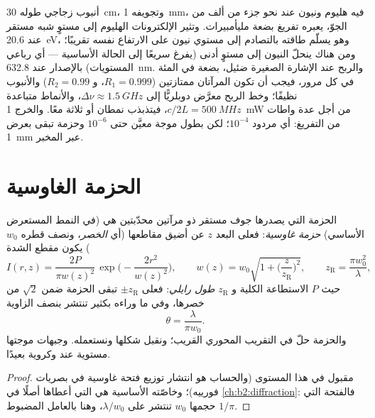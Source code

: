 \begin{example}\label{ex:b2:laser:hene}
أنبوب زجاجي طوله \qty{30}{cm}، وتجويفه \qty{1}{mm}، فيه هليوم
ونيون عند نحو جزء من ألف من الجوّ، يعبره تفريغ
بضعة مليأمبيرات. وتثير الإلكترونات الهليوم إلى مستوٍ شبه مستقر عند
\qty{20.6}{eV}، وهو يسلّم طاقته بالتصادم إلى مستوي نيون على
الارتفاع نفسه تقريبًا؛ ومن هناك ينحلّ النيون إلى مستوٍ أدنى
(يفرغ سريعًا إلى الحالة الأساسية --- أي رباعي المستويات) بالإصدار عند
\qty{632.8}{nm}. والربح عند الإشارة الصغيرة ضئيل، بضعة في المئة في كل
مرور، فيجب أن تكون المرآتان ممتازتين ($R_1 = 0.999$، و $R_2 = 0.99$)
والأنبوب نظيفًا؛ وخط الربح معرَّض دوبلريًّا إلى
$\Delta\nu \approx \qty{1.5}{GHz}$، والأنماط متباعدة $c/2L = \qty{500}{MHz}$،
فيتذبذب نمطان أو ثلاثة معًا. والخرج \qty{1}{mW} من أجل
عدة واطات من التفريغ: أي مردود $10^{-4}$؛ لكن بطول موجة
معيَّن حتى $10^{-6}$ وحزمة تبقى بعرض \qty{1}{mm} عبر
المخبر.
\end{example}

\section{الحزمة الغاوسية}

\begin{proposition}\label{prop:b2:laser:gaussian}
الحزمة التي يصدرها جوف مستقر ذو مرآتين محدّبتين هي (في
النمط المستعرض الأساسي) \emph{حزمة غاوسية}: فعلى البعد $z$ عن أضيق مقاطعها (أي
\emph{الخصر}، ونصف قطره $w_0$) يكون مقطع
الشدة
\[
I(r,z) = \frac{2P}{\pi w(z)^2}\,\exp\Big(-\frac{2r^2}{w(z)^2}\Big),
\qquad
w(z) = w_0\sqrt{1 + \Big(\frac{z}{z_{\text{R}}}\Big)^2},
\qquad
z_{\text{R}} = \frac{\pi w_0^2}{\lambda},
\]
حيث $P$ الاستطاعة الكلية و $z_{\text{R}}$ \emph{طول
رايلي}: فعلى $\pm z_{\text{R}}$ تبقى الحزمة
ضمن $\sqrt2$ من خصرها، وفي ما وراءه بكثير تنتشر بنصف
الزاوية
\[
\theta = \frac{\lambda}{\pi w_0} .
\]
والحزمة حلّ  في التقريب
المحوري القريب؛ ونقبل شكلها ونستعمله. وجبهات موجتها مستوية عند
 وكروية بعيدًا.
\end{proposition}

\begin{proof}
مقبول في هذا المستوى (والحساب هو انتشار توزيع فتحة غاوسية
في بصريات فورييه)؛ وخاصّته الأساسية هي
التي أعطاها  أصلًا في \cref{ch:b2:diffraction}: فالفتحة
التي حجمها $w_0$ تنتشر على $\lambda/w_0$، وهنا بالعامل المضبوط
$1/\pi$.
\end{proof}

